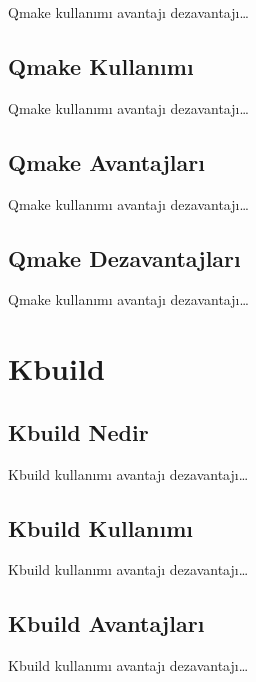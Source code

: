 \documentclass[
]{book}
\begin{document}
Qmake kullanımı avantajı dezavantajı\ldots{}

\hypertarget{qmake-kullanux131mux131}{%
\section{Qmake Kullanımı}\label{qmake-kullanux131mux131}}

Qmake kullanımı avantajı dezavantajı\ldots{}

\hypertarget{qmake-avantajlarux131}{%
\section{Qmake Avantajları}\label{qmake-avantajlarux131}}

Qmake kullanımı avantajı dezavantajı\ldots{}

\hypertarget{qmake-dezavantajlarux131}{%
\section{Qmake Dezavantajları}\label{qmake-dezavantajlarux131}}

Qmake kullanımı avantajı dezavantajı\ldots{}

\hypertarget{kbuild}{%
\chapter{Kbuild}\label{kbuild}}

\hypertarget{kbuild-nedir}{%
\section{Kbuild Nedir}\label{kbuild-nedir}}

Kbuild kullanımı avantajı dezavantajı\ldots{}

\hypertarget{kbuild-kullanux131mux131}{%
\section{Kbuild Kullanımı}\label{kbuild-kullanux131mux131}}

Kbuild kullanımı avantajı dezavantajı\ldots{}

\hypertarget{kbuild-avantajlarux131}{%
\section{Kbuild Avantajları}\label{kbuild-avantajlarux131}}

Kbuild kullanımı avantajı dezavantajı\ldots{}
\end{document}
